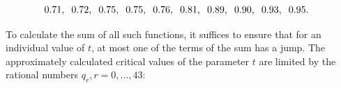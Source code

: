 \begin{align*}
&0.71, \text{\hspace{0.2cm}} 0.72, \text{\hspace{0.2cm}} 0.75, \text{\hspace{0.2cm}} 0.75, \text{\hspace{0.2cm}} 0.76, \text{\hspace{0.2cm}} 0.81, \text{\hspace{0.2cm}} 0.89, \text{\hspace{0.2cm}} 0.90, \text{\hspace{0.2cm}} 0.93, \text{\hspace{0.2cm}} 0.95.
\end{align*}

To calculate the sum of all such functions, it suffices to ensure that for an individual value of $t$, at most one of the terms of the sum has a jump. The approximately calculated critical values of the parameter $t$ are limited by the rational numbers $q_{r}, r = 0, ..., 43$:


